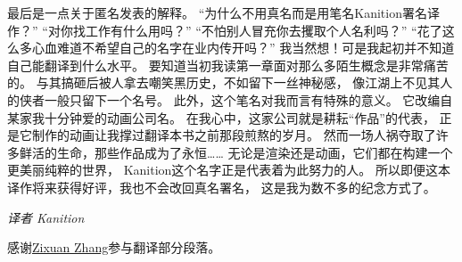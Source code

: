 最后是一点关于匿名发表的解释。
“为什么不用真名而是用笔名Kanition署名译作？”
“对你找工作有什么用吗？”
“不怕别人冒充你去攫取个人名利吗？”
“花了这么多心血难道不希望自己的名字在业内传开吗？”
我当然想！可是我起初并不知道自己能翻译到什么水平。
要知道当初我读第一章面对那么多陌生概念是非常痛苦的。
与其搞砸后被人拿去嘲笑黑历史，不如留下一丝神秘感，
像江湖上不见其人的侠者一般只留下一个名号。
此外，这个笔名对我而言有特殊的意义。
它改编自某家我十分钟爱的动画公司名。
在我心中，这家公司就是耕耘“作品”的代表，
正是它制作的动画让我撑过翻译本书之前那段煎熬的岁月。
然而一场人祸夺取了许多鲜活的生命，那些作品成为了永恒……
无论是渲染还是动画，它们都在构建一个更美丽纯粹的世界，
Kanition这个名字正是代表着为此努力的人。
所以即便这本译作将来获得好评，我也不会改回真名署名，
这是我为数不多的纪念方式了。

\vspace{15pt}
{\hfill {\itshape 译者 Kanition}\qquad}

\vspace{15pt}

感谢\href{https://zixuan-zhang.com}{Zixuan Zhang}参与翻译部分段落。